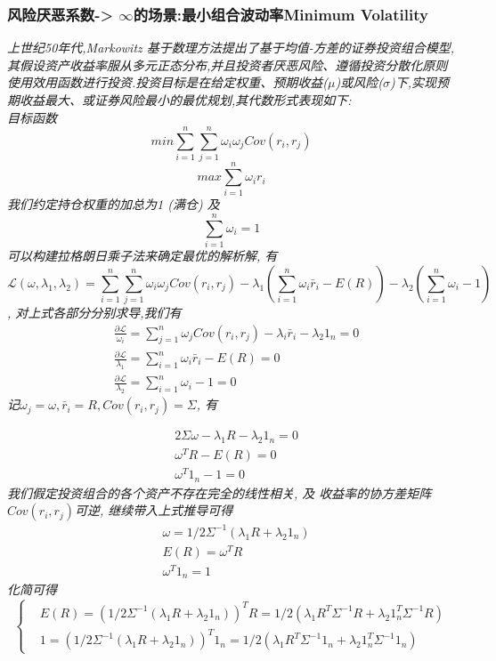 \documentclass{scrartcl}
\numberwithin{equation}{section}   %
\begin{document}
\subsubsection{风险厌恶系数-> $\infty$的场景:最小组合波动率Minimum Volatility}
\textsl{
    上世纪50年代,Markowitz 基于数理方法提出了基于均值-方差的证券投资组合模型,其假设资产收益率服从多元正态分布,并且投资者厌恶风险、遵循投资分散化原则使用效用函数进行投资.投资目标是在给定权重、预期收益($\mu$)或风险($\sigma$)下,实现预期收益最大、或证券风险最小的最优规划,其代数形式表现如下:\\
    目标函数  $$ min \sum_{i=1}^n \sum_{j=1}^n \omega_i \omega_j Cov(r_i, r_j)$$ $$ max  \sum_{i=1}^n \omega_i r_i$$
    我们约定持仓权重的加总为1 (满仓) 及 $$\sum_{i=1}^n \omega_i =1 $$ 可以构建拉格朗日乘子法来确定最优的解析解, 有 $$\mathcal{L} (\omega, \lambda_1, \lambda_2) = \sum_{i=1}^n \sum_{j=1}^n \omega_i \omega_j Cov(r_i, r_j) - \lambda_1(\sum_{i=1}^n \omega_i \bar{r}_i - E(R)) - \lambda_2 (\sum_{i=1}^n \omega_i -1) $$, 对上式各部分分别求导,我们有}
\begin{equation}
    \begin{aligned}
         & \frac{\partial \mathcal{L}}{\omega_i} = \sum_{j=1}^n \omega_j Cov(r_i, r_j) - \lambda_i \bar{r}_i - \lambda_2 1_n =0 \\ & \frac{\partial \mathcal{L}}{\lambda_1} = \sum_{i=1}^n \omega_i \bar{r}_i - E(R) =0 \\ & \frac{\partial \mathcal{L}}{\lambda_2} = \sum_{i=1}^n \omega_i -1 =0
    \end{aligned}
\end{equation}
\textsl{
    记$\omega_j = \omega, \bar{r}_i =R,  Cov(r_i, r_j) = \Sigma $, 有}

\begin{equation}
    \begin{aligned}
         & 2 \Sigma \omega  - \lambda_1 R - \lambda_2 1_n =0 \\ & \omega^T R - E(R) = 0 \\ & \omega^T  1_n  -1 = 0
    \end{aligned}
\end{equation}
\textsl{我们假定投资组合的各个资产不存在完全的线性相关, 及 收益率的协方差矩阵$Cov(r_i, r_j)$可逆, 继续带入上式推导可得}
\begin{equation}
    \begin{aligned}
         & \omega = 1/2 \Sigma^{-1}(\lambda_1 R +\lambda_2 1_n) \\ & E(R) = \omega^T R \\ & \omega^T  1_n = 1
    \end{aligned}
\end{equation}
\textsl{
    化简可得
}
\begin{equation}
    \left\{
    \begin{array}{lr}
         & E(R) = (1/2 \Sigma^{-1}(\lambda_1 R +\lambda_2 1_n))^T R = 1/2(\lambda_1 R^T \Sigma^{-1} R + \lambda_2 1_n^T \Sigma^{-1} R) \\ & 1 = (1/2 \Sigma^{-1}(\lambda_1 R +\lambda_2 1_n))^T  1_n  = 1/2(\lambda_1 R^T \Sigma^{-1} 1_n + \lambda_2 1_n^T \Sigma^{-1} 1_n)
    \end{array}
    \right.
\end{equation}
\end{document}
